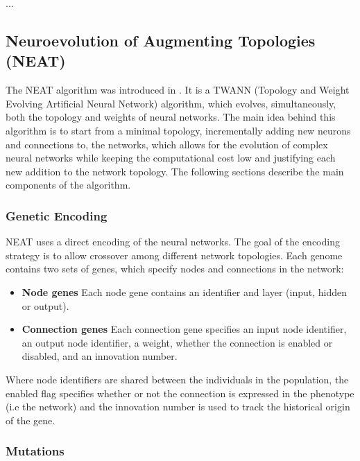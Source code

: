 ...


\subsection{Neuroevolution of Augmenting Topologies (NEAT)}

The NEAT algorithm was introduced in \cite{neat}. It is a TWANN (Topology and Weight Evolving Artificial Neural Network) algorithm, which evolves, simultaneously,  both
the topology and weights of neural networks. The main idea behind this algorithm is to start from a minimal topology, incrementally adding new neurons and connections to,
the networks, which allows for the evolution of complex neural networks while keeping the computational cost low and justifying each new addition to the network topology.
The following sections describe the main components of the algorithm.

\subsubsection{Genetic Encoding}

NEAT uses a direct encoding of the neural networks. The goal of the encoding strategy is to allow crossover among different network topologies.
Each genome contains two sets of genes, which specify nodes and connections in the network:

\begin{itemize}
    \item \textbf{Node genes} Each node gene contains an identifier and layer (input, hidden or output).
    \item \textbf{Connection genes} Each connection gene specifies an input node identifier, an output node identifier, a weight, whether the connection is enabled or
        disabled, and an innovation number.
\end{itemize}


Where node identifiers are shared between the individuals in the population, the enabled flag specifies whether or not the connection is expressed in the phenotype (i.e
the network) and the innovation number is used to track the historical origin of the gene.

\subsubsection{Mutations}

